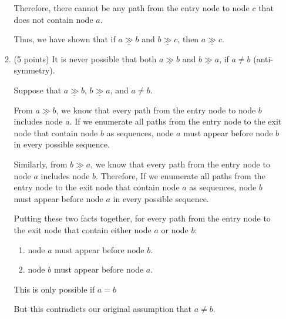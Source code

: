 \documentclass[12pt]{article}
\newcommand{\dom}{\underline{\gg}}
\begin{document}
\begin{enumerate}
\begin{enumerate}
\begin{mdframed}
          \medskip

          Therefore, there cannot be any path from the entry node to node \( c \) that does not contain node \( a \).

          \medskip

          Thus, we have shown that if \( a \dom b \) and \( b \dom c \), then \( a \dom c \).

        \end{mdframed}

        \item (5 points) It is never possible that both $a \dom b$ and $b \dom
        a$, if $a \neq b$ (anti-symmetry).
        \begin{mdframed}
          Suppose that \( a \dom b \), \( b \dom a \), and \( a \neq b \).

          \medskip

          From \( a \dom b \), we know that every path from the entry node to node \( b \) includes node \( a \).  
          If we enumerate all paths from the entry node to the exit node that contain node \( b \) as sequences, node \( a \) must appear before node \( b \) in every possible sequence.

          \medskip

          Similarly, from \( b \dom a \), we know that every path from the entry node to node \( a \) includes node \( b \).  
          Therefore, If we enumerate all paths from the entry node to the exit node that contain node \( a \) as sequences, node \( b \) must appear before node \( a \) in every possible sequence.

          \medskip

          Putting these two facts together, for every path from the entry node to the exit node that contain either node \( a \) or node \( b \):

          \begin{enumerate}
              \item node \( a \) must appear before node \( b \).
              \item node \( b \) must appear before node \( a \).
          \end{enumerate}

          This is only possible if \( a = b \)

          \medskip

          But this contradicts our original assumption that \( a \neq b \).


\end{mdframed}
\end{enumerate}
\end{enumerate}
\end{document}
